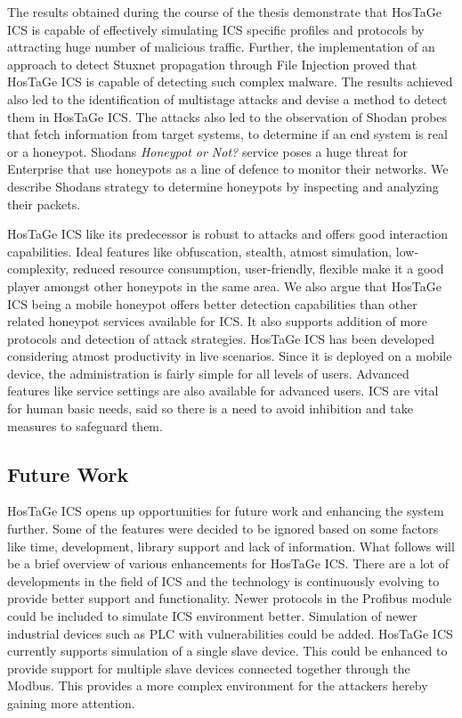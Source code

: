 \documentclass[article,msc=informatik,type=msc,colorback,accentcolor=tud9c]{tudthesis}
\begin{document}
	\vspace{3mm}
	The results obtained during the course of the thesis demonstrate that HosTaGe ICS is capable of effectively simulating \ac{ICS} specific profiles and protocols by attracting huge number of malicious traffic. Further, the implementation of an approach to detect Stuxnet propagation through File Injection proved that HosTaGe ICS is capable of detecting such complex malware. The results achieved also led to the identification of multistage attacks and devise a method to detect them in HosTaGe ICS. The attacks also led to the observation of Shodan probes that fetch information from target systems, to determine if an end system is real or a honeypot. Shodans \textit{Honeypot or Not?} service poses a huge threat for Enterprise that use honeypots as  a line of defence to monitor their networks. We describe Shodans strategy to determine honeypots by inspecting and analyzing their packets.
	
	
	\vspace{3mm}
	HosTaGe ICS like its predecessor is robust to attacks and offers good interaction capabilities. Ideal features like obfuscation, stealth, atmost simulation, low-complexity, reduced resource consumption, user-friendly, flexible make it a good player amongst other honeypots in the same area. We also argue that HosTaGe ICS being a mobile honeypot offers better detection capabilities than other related honeypot services available for \ac{ICS}. It also supports addition of more protocols and detection of attack strategies. HosTaGe ICS has been developed considering atmost productivity in live scenarios. Since it is deployed on a mobile device, the administration is fairly simple for all levels of users. Advanced features like service settings are also available for advanced users. \ac{ICS} are vital for human basic needs, said so there is a need to avoid inhibition and take measures to safeguard them. 

  	\vspace{3mm}
  	
  	\subsection{Future Work}\label{Future Work}
  	HosTaGe ICS opens up opportunities for future work and enhancing the system further. Some of the features were decided to be ignored based on some factors like time, development, library support and lack of information. What follows will be a brief overview of various enhancements for HosTaGe ICS.
  	There are a lot of developments in the field of \ac{ICS} and the technology is continuously evolving to provide better support and functionality. Newer protocols in the Profibus\cite{tovar1999real} module could be included to simulate \ac{ICS} environment better. Simulation of newer industrial devices such as \ac{PLC} with vulnerabilities could be added. HosTaGe ICS currently supports simulation of a single slave device. This could be enhanced to provide support for multiple slave devices connected together through the Modbus. This provides a more complex environment for the attackers hereby gaining more attention. 
\end{document}
